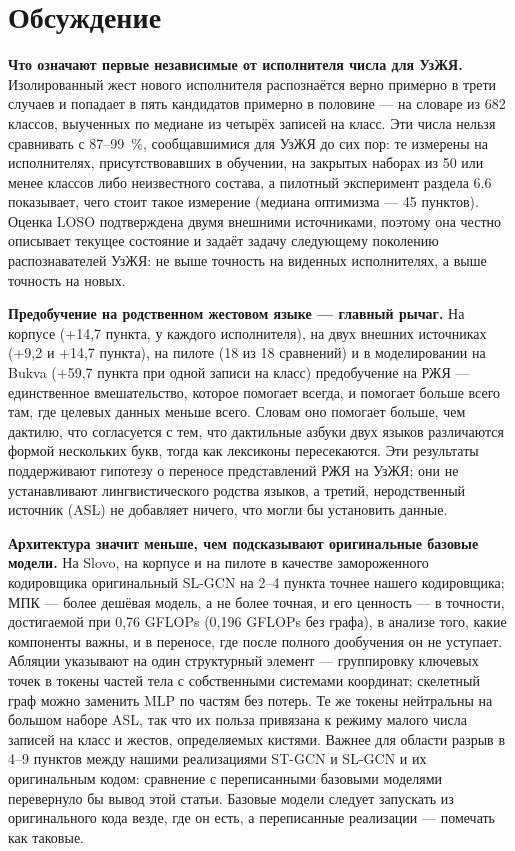 \documentclass[a4paper,fleqn]{cas-dc}
\begin{document}
\hypertarget{ux43eux431ux441ux443ux436ux434ux435ux43dux438ux435}{%
\section{Обсуждение}\label{ux43eux431ux441ux443ux436ux434ux435ux43dux438ux435}}

\textbf{Что означают первые независимые от исполнителя числа для УзЖЯ.} Изолированный жест нового исполнителя распознаётся верно примерно в трети случаев и попадает в пять кандидатов примерно в половине --- на словаре из 682 классов, выученных по медиане из четырёх записей на класс. Эти числа нельзя сравнивать с 87--99~\%, сообщавшимися для УзЖЯ до сих пор: те измерены на исполнителях, присутствовавших в обучении, на закрытых наборах из 50 или менее классов либо неизвестного состава, а пилотный эксперимент раздела 6.6 показывает, чего стоит такое измерение (медиана оптимизма --- 45 пунктов). Оценка LOSO подтверждена двумя внешними источниками, поэтому она честно описывает текущее состояние и задаёт задачу следующему поколению распознавателей УзЖЯ: не выше точность на виденных исполнителях, а выше точность на новых.

\textbf{Предобучение на родственном жестовом языке --- главный рычаг.} На корпусе (+14,7 пункта, у каждого исполнителя), на двух внешних источниках (+9,2 и +14,7 пункта), на пилоте (18 из 18 сравнений) и в моделировании на Bukva (+59,7 пункта при одной записи на класс) предобучение на РЖЯ --- единственное вмешательство, которое помогает всегда, и помогает больше всего там, где целевых данных меньше всего. Словам оно помогает больше, чем дактилю, что согласуется с тем, что дактильные азбуки двух языков различаются формой нескольких букв, тогда как лексиконы пересекаются. Эти результаты поддерживают гипотезу о переносе представлений РЖЯ на УзЖЯ; они не устанавливают лингвистического родства языков, а третий, неродственный источник (ASL) не добавляет ничего, что могли бы установить данные.

\textbf{Архитектура значит меньше, чем подсказывают оригинальные базовые модели.} На Slovo, на корпусе и на пилоте в качестве замороженного кодировщика оригинальный SL-GCN на 2--4 пункта точнее нашего кодировщика; МПК --- более дешёвая модель, а не более точная, и его ценность --- в точности, достигаемой при 0,76 GFLOPs (0,196 GFLOPs без графа), в анализе того, какие компоненты важны, и в переносе, где после полного дообучения он не уступает. Абляции указывают на один структурный элемент --- группировку ключевых точек в токены частей тела с собственными системами координат; скелетный граф можно заменить MLP по частям без потерь. Те же токены нейтральны на большом наборе ASL, так что их польза привязана к режиму малого числа записей на класс и жестов, определяемых кистями. Важнее для области разрыв в 4--9 пунктов между нашими реализациями ST-GCN и SL-GCN и их оригинальным кодом: сравнение с переписанными базовыми моделями перевернуло бы вывод этой статьи. Базовые модели следует запускать из оригинального кода везде, где он есть, а переписанные реализации --- помечать как таковые.
\end{document}
